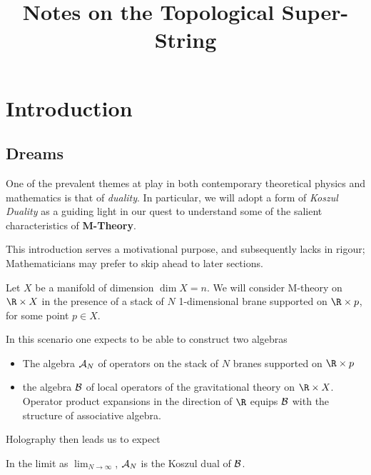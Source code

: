 \documentclass[12pt]{amsart}
\title{Notes on the Topological Super-String}
\begin{document}

  
  \maketitle
  \tableofcontents
  \mbox{}

  \section{Introduction}

  \subsection{Dreams}
  One of the prevalent themes at play in both contemporary theoretical physics
  and mathematics is that of \textit{duality}. In particular, we will adopt a
  form of \textit{Koszul Duality} as a guiding light in our quest to understand
  some of the salient characteristics of \textbf{M-Theory}.\par

  \begin{rmk}
    This introduction serves a motivational purpose, and subsequently lacks in
    rigour; Mathematicians may prefer to skip ahead to later sections.
  \end{rmk}

  Let $X$ be a manifold of dimension $\dim X = n$. We will consider
  M-theory on $\R \times X$ in the presence of a stack of $N$ 1-dimensional brane supported
  on $\R \times p$, for some point $p \in X$.

  In this scenario one expects to be able to construct two algebras

  \begin{itemize}
    \item The algebra $\mathcal{A}_N$ of operators on the stack of $N$ branes supported
      on $\R \times p$
    \item the algebra $\mathcal{B}$ of local operators of the gravitational theory
      on $\R \times X$. Operator product expansions in the direction of $\R$ equips $\mathcal{B}$ with the
  structure of associative algebra.
  \end{itemize}

  Holography then leads us to expect
  \begin{conj}
    In the limit as $\lim_{N \rightarrow \infty}$, $\mathcal{A}_N$ is the Koszul
    dual of $\mathcal{B}$.
  \end{conj}
\end{document}
